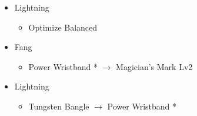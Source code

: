 \begin{paracol}{2}
\begin{menu}
\begin{itemize}
\begin{itemize}
\begin{itemize}
				      \end{itemize}
			\end{itemize}
			\equip
			\begin{itemize}
				\item Lightning
				      \begin{itemize}
					      \item Optimize Balanced
				      \end{itemize}
				\item Fang
				      \begin{itemize}
					      \item Power Wristband * $\rightarrow$ Magician's Mark Lv2
				      \end{itemize}
				\item Lightning
				      \begin{itemize}
					      \item Tungsten Bangle $\rightarrow$ Power Wristband *
				      \end{itemize}
			\end{itemize}
		\end{itemize}
	\end{menu}
	\switchcolumn


\end{paracol}
